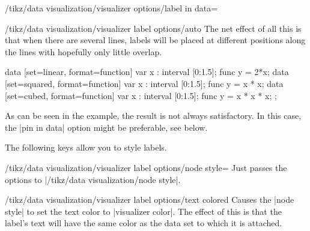 \begin{key}{/tikz/data visualization/visualizer options/label in data=}
\begin{key}{/tikz/data visualization/visualizer label options/auto}
        The net effect of all this is that when there are several lines, labels
        will be placed at different positions along the lines with hopefully
        only little overlap.
\begin{codeexample}[
    width=6.3cm,
    preamble={\usetikzlibrary{datavisualization.formats.functions}},
]
\tikz \datavisualization [
  scientific axes=clean,
  visualize as smooth line/.list={linear, squared, cubed},
  linear ={label in data={text=$2x$}},
  squared={label in data={text=$x^2$}},
  cubed  ={label in data={text=$x^3$}}]
data [set=linear, format=function] {
  var x : interval [0:1.5];
  func y = 2*\value x;
}
data [set=squared, format=function] {
  var x : interval [0:1.5];
  func y = \value x * \value x;
}
data [set=cubed, format=function] {
  var x : interval [0:1.5];
  func y = \value x * \value x * \value x;
};
\end{codeexample}
        As can be seen in the example, the result is not always satisfactory.
        In this case, the |pin in data| option might be preferable, see below.
    \end{key}

    The following keys allow you to style labels.

    \begin{key}{/tikz/data visualization/visualizer label options/node style=}
        Just passes the options to |/tikz/data visualization/node style|.
    \end{key}
    \begin{key}{/tikz/data visualization/visualizer label options/text colored}
        Causes the |node style| to set the text color to |visualizer color|.
        The effect of this is that the label's text will have the same color as
        the data set to which it is attached.
    \end{key}


\end{key}
